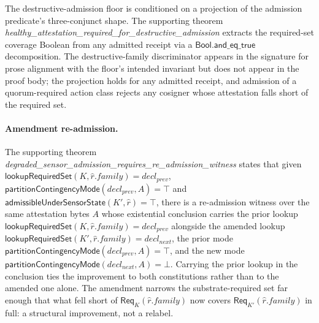 The destructive-admission floor is conditioned on a projection of the admission predicate's three-conjunct shape. The supporting theorem \emph{healthy\_\allowbreak attestation\_\allowbreak required\_\allowbreak for\_\allowbreak destructive\_\allowbreak admission} extracts the required-set coverage Boolean from any admitted receipt via a $\mathsf{Bool.and\_eq\_true}$ decomposition. The destructive-family discriminator appears in the signature for prose alignment with the floor's intended invariant but does not appear in the proof body; the projection holds for any admitted receipt, and admission of a quorum-required action class rejects any cosigner whose attestation falls short of the required set.

\paragraph{Amendment re-admission.}
The supporting theorem \emph{degraded\_\allowbreak sensor\_\allowbreak admission\_\allowbreak requires\_\allowbreak re\_\allowbreak admission\_\allowbreak witness} states that given $\mathsf{lookupRequiredSet}(K, \hat r.\mathit{family}) = \mathit{decl}_{\mathit{prev}}$, $\mathsf{partitionContingencyMode}(\mathit{decl}_{\mathit{prev}}, A) = \top$ and $\mathsf{admissibleUnderSensorState}(K', \hat r) = \top$, there is a re-admission witness over the same attestation bytes $A$ whose existential conclusion carries the prior lookup $\mathsf{lookupRequiredSet}(K, \hat r.\mathit{family}) = \mathit{decl}_{\mathit{prev}}$ alongside the amended lookup $\mathsf{lookupRequiredSet}(K', \hat r.\mathit{family}) = \mathit{decl}_{\mathit{next}}$, the prior mode $\mathsf{partitionContingencyMode}(\mathit{decl}_{\mathit{prev}}, A) = \top$, and the new mode $\mathsf{partitionContingencyMode}(\mathit{decl}_{\mathit{next}}, A) = \bot$. Carrying the prior lookup in the conclusion ties the improvement to both constitutions rather than to the amended one alone. The amendment narrows the substrate-required set far enough that what fell short of $\mathsf{Req}_K(\hat r.\mathit{family})$ now covers $\mathsf{Req}_{K'}(\hat r.\mathit{family})$ in full: a structural improvement, not a relabel.

